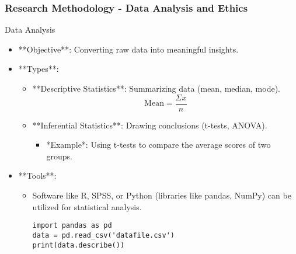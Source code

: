 \documentclass[aspectratio=169]{beamer}
\begin{document}
\begin{frame}[fragile]
    \frametitle{Research Methodology - Data Analysis and Ethics}
    \begin{block}{Data Analysis}
        \begin{itemize}
            \item **Objective**: Converting raw data into meaningful insights.
            \item **Types**:
                \begin{itemize}
                    \item **Descriptive Statistics**: Summarizing data (mean, median, mode).
                    \begin{equation}
                        \text{Mean} = \frac{\Sigma x}{n}
                    \end{equation}
                    \item **Inferential Statistics**: Drawing conclusions (t-tests, ANOVA).
                    \begin{itemize}
                        \item *Example*: Using t-tests to compare the average scores of two groups.
                    \end{itemize}
                \end{itemize}
            \item **Tools**:
                \begin{itemize}
                    \item Software like R, SPSS, or Python (libraries like pandas, NumPy) can be utilized for statistical analysis.
                    \begin{lstlisting}
import pandas as pd
data = pd.read_csv('datafile.csv')
print(data.describe())
                    \end{lstlisting}
                \end{itemize}
        \end{itemize}
    \end{block}


\end{frame}
\end{document}
